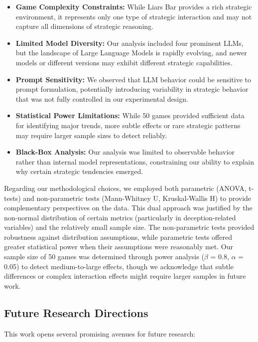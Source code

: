 \documentclass{article}
\begin{document}
\begin{itemize}
    \item \textbf{Game Complexity Constraints:} While Liars Bar provides a rich strategic environment, it represents only one type of strategic interaction and may not capture all dimensions of strategic reasoning.
    
    \item \textbf{Limited Model Diversity:} Our analysis included four prominent LLMs, but the landscape of Large Language Models is rapidly evolving, and newer models or different versions may exhibit different strategic capabilities.
    
    \item \textbf{Prompt Sensitivity:} We observed that LLM behavior could be sensitive to prompt formulation, potentially introducing variability in strategic behavior that was not fully controlled in our experimental design.
    
    \item \textbf{Statistical Power Limitations:} While 50 games provided sufficient data for identifying major trends, more subtle effects or rare strategic patterns may require larger sample sizes to detect reliably.
    
    \item \textbf{Black-Box Analysis:} Our analysis was limited to observable behavior rather than internal model representations, constraining our ability to explain why certain strategic tendencies emerged.
\end{itemize}

Regarding our methodological choices, we employed both parametric (ANOVA, t-tests) and non-parametric tests (Mann-Whitney U, Kruskal-Wallis H) to provide complementary perspectives on the data. This dual approach was justified by the non-normal distribution of certain metrics (particularly in deception-related variables) and the relatively small sample size. The non-parametric tests provided robustness against distribution assumptions, while parametric tests offered greater statistical power when their assumptions were reasonably met. Our sample size of 50 games was determined through power analysis ($\beta$ = 0.8, $\alpha$ = 0.05) to detect medium-to-large effects, though we acknowledge that subtle differences or complex interaction effects might require larger samples in future work.

\subsection{Future Research Directions}
This work opens several promising avenues for future research:
\end{document}
